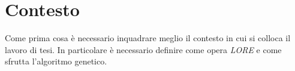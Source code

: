 \chapter{Contesto}

Come prima cosa è necessario inquadrare meglio il contesto in cui si colloca
il lavoro di tesi. In particolare è necessario definire come opera
\textit{LORE} e come sfrutta l'algoritmo genetico.
